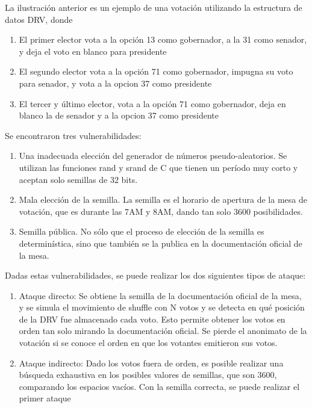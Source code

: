 La ilustración anterior es un ejemplo de una votación utilizando la estructura de datos DRV, donde
\begin{enumerate}
	\item El primer elector vota a la opción 13 como gobernador, a la 31 como senador, y deja el voto en blanco para presidente
	\item El segundo elector vota a la opción 71 como gobernador, impugna su voto para senador, y vota a la opcion 37 como presidente
	\item El tercer y último elector, vota a la opción 71 como gobernador, deja en blanco la de senador y a la opcion 37 como presidente
\end{enumerate}

Se encontraron tres vulnerabilidades:
\begin{enumerate}
	\item Una inadecuada elección del generador de números pseudo-aleatorios. Se utilizan las funciones rand y srand de C que tienen un período muy corto y aceptan solo semillas de 32 bits.
	\item Mala elección de la semilla. La semilla es el horario de apertura de la mesa de votación, que es durante las 7AM y 8AM, dando tan solo 3600 posibilidades.
	\item Semilla pública. No sólo que el proceso de elección de la semilla es determinística, sino que también se la publica en la documentación oficial de la mesa.
\end{enumerate}

Dadas estas vulnerabilidades, se puede realizar los dos siguientes tipos de ataque:
\begin{enumerate}
	\item Ataque directo: Se obtiene la semilla de la documentación oficial de la mesa, y se simula el movimiento de shuffle con N votos y se detecta en qué posición de la DRV fue almacenado cada voto. Esto permite obtener los votos en orden tan solo mirando la documentación oficial. Se pierde el anonimato de la votación si se conoce el orden en que los votantes emitieron sus votos.
	\item Ataque indirecto: Dado los votos fuera de orden, es posible realizar una búsqueda exhaustiva en los posibles valores de semillas, que son 3600, comparando los espacios vacíos.  Con la semilla correcta, se puede realizar el primer ataque
\end{enumerate}

